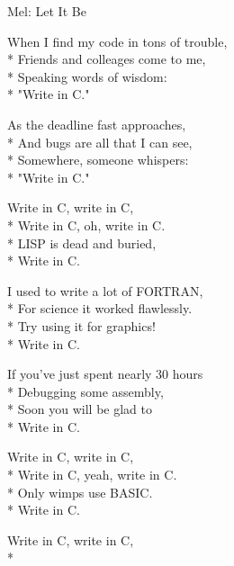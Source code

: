 \begin{SongText}[Write in C]
    \begin{SongInfo}
        Mel: Let It Be
    \end{SongInfo}
    \begin{SongVerse}
        When I find my code in tons of trouble,\\*%
        Friends and colleages come to me,\\*%
        Speaking words of wisdom:\\*%
        "Write in C."
    \end{SongVerse}
    \begin{SongVerse}
        As the deadline fast approaches,\\*%
        And bugs are all that I can see,\\*%
        Somewhere, someone whispers:\\*%
        "Write in C."
    \end{SongVerse}
    \begin{SongVerse}
        Write in C, write in C,\\*%
        Write in C, oh, write in C.\\*%
        LISP is dead and buried,\\*%
        Write in C.
    \end{SongVerse}
    \begin{SongVerse}
        I used to write a lot of FORTRAN,\\*%
        For science it worked flawlessly.\\*%
        Try using it for graphics!\\*%
        Write in C.
    \end{SongVerse}
    \begin{SongVerse}
        If you've just spent nearly 30 hours\\*%
        Debugging some assembly,\\*%
        Soon you will be glad to\\*%
        Write in C.
    \end{SongVerse}
    \begin{SongVerse}
        Write in C, write in C,\\*%
        Write in C, yeah, write in C.\\*%
        Only wimps use BASIC.\\*%
        Write in C.
    \end{SongVerse}
    \begin{SongVerse}
        Write in C, write in C,\\*%

\end{SongVerse}
\end{SongText}

